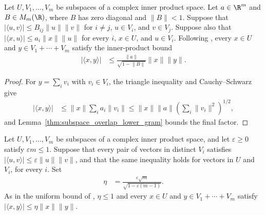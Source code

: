 \begin{lemma}
    \label{thm:subspace_overlap_sum}
    \leanok
    Let $U,V_1,\ldots,V_m$ be subspaces of a complex inner product space.
    Let $a\in\R^m$ and $B\in M_m(\R)$, where $B$ has zero
    diagonal and $\lVert B\rVert<1$. Suppose that
    $|\langle u,v\rangle|\leq B_{ij}\lVert u\rVert\lVert v\rVert$
    for $i\neq j$, $u\in V_i$, and $v\in V_j$. Suppose also that
    $|\langle x,u\rangle|\leq a_i\lVert x\rVert\lVert u\rVert$
    for every $i$, $x\in U$, and $u\in V_i$.
    Following \cite[Lemma~9]{Nachtergaele1996Spectral}, every $x\in U$ and
    $y\in V_1+\cdots+V_m$ satisfy the inner-product bound
    \begin{align}
        |\langle x,y\rangle|
         & \leq\frac{\lVert a\rVert}{\sqrt{1-\lVert B\rVert}}
        \lVert x\rVert\lVert y\rVert.
    \end{align}
\end{lemma}

\begin{proof}
    \leanok
    For $y=\sum_i v_i$ with $v_i\in V_i$, the triangle inequality and
    Cauchy--Schwarz give
    \begin{align}
        |\langle x,y\rangle|
         & \leq\lVert x\rVert\sum_i a_i\lVert v_i\rVert
        \leq\lVert x\rVert\lVert a\rVert
        \left(\sum_i\lVert v_i\rVert^2\right)^{1/2},
    \end{align}
    and Lemma~\ref{thm:subspace_overlap_lower_gram} bounds the final factor.
\end{proof}

\begin{lemma}
    \label{thm:subspace_overlap_sum_uniform}
    \leanok
    Let $U,V_1,\ldots,V_m$ be subspaces of a complex inner product space,
    and let $\varepsilon\geq0$ satisfy $\varepsilon m\leq1$.
    Suppose that every pair of vectors in distinct $V_i$ satisfies
    $|\langle u,v\rangle|\leq\varepsilon\lVert u\rVert\lVert v\rVert$,
    and that the same inequality holds for vectors in $U$ and $V_i$, for
    every $i$. Set
    \begin{align}
        \eta & =\frac{\varepsilon\sqrt m}
        {\sqrt{1-\varepsilon(m-1)}}.
    \end{align}
    As in the uniform bound of \cite[Lemma~9]{Nachtergaele1996Spectral},
    $\eta\leq1$ and every $x\in U$ and $y\in V_1+\cdots+V_m$ satisfy
    $|\langle x,y\rangle|\leq\eta\lVert x\rVert\lVert y\rVert$.
\end{lemma}

